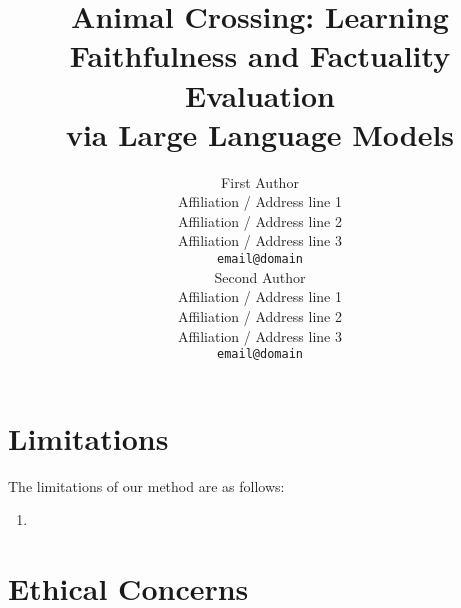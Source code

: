 \documentclass[11pt]{article}
\title{Animal Crossing: Learning Faithfulness and Factuality Evaluation \\ via Large Language Models}
\author{First Author \\
  Affiliation / Address line 1 \\
  Affiliation / Address line 2 \\
  Affiliation / Address line 3 \\
  \texttt{email@domain} \\\And
  Second Author \\
  Affiliation / Address line 1 \\
  Affiliation / Address line 2 \\
  Affiliation / Address line 3 \\
  \texttt{email@domain} \\}
\begin{document}
\maketitle









\section{Limitations}
The limitations of our method are as follows:
\begin{enumerate}[nosep,leftmargin=*]
    \item 
\end{enumerate}

\section{Ethical Concerns}



\clearpage


\clearpage
\appendix


\end{document}
